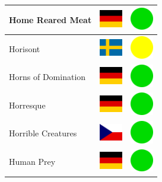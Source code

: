 \documentclass[12pt, a4paper, twoside]{report}
\begin{document}
\begin{center}
\begin{longtable}{|p{5cm}|p{2cm}|p{2cm}|}
Home Reared Meat & \includegraphics[width=1cm]{4x3/de} & \includegraphics[width=1cm]{likes/y} \\ \hline
Horisont & \includegraphics[width=1cm]{4x3/se} & \includegraphics[width=1cm]{likes/m} \\ \hline
Horns of Domination & \includegraphics[width=1cm]{4x3/de} & \includegraphics[width=1cm]{likes/y} \\ \hline
Horresque & \includegraphics[width=1cm]{4x3/de} & \includegraphics[width=1cm]{likes/y} \\ \hline
Horrible Creatures & \includegraphics[width=1cm]{4x3/cz} & \includegraphics[width=1cm]{likes/y} \\ \hline
Human Prey & \includegraphics[width=1cm]{4x3/de} & \includegraphics[width=1cm]{likes/y} \\ \hline

\end{longtable}
\end{center}
\end{document}
